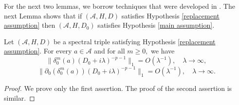     For the next two lemmas, we borrow { techniques} that were developed in \cite{CGRS2}. The next Lemma shows that if $(\mathcal{A},H,D)$ satisfies
    Hypothesis \ref{replacement assumption} then $(\mathcal{A},H,D_0)$ satisfies Hypothesis \ref{main assumption}.
    \begin{lem}\label{main replacement lemma} 
        Let $(\mathcal{A},H,D)$ be a spectral triple satisfying Hypothesis \ref{replacement assumption}. For every $a\in\mathcal{A}$ and for all $m\geq0,$ we have 
        $$\Big\|\delta_0^m(a)(D_0+i\lambda)^{-p-1}\Big\|_1=O(\lambda^{-1}),\quad\lambda\to\infty,$$
        $$\Big\|\partial_0(\delta_0^m(a))(D_0+i\lambda)^{-p-1}\Big\|_1=O(\lambda^{-1}),\quad\lambda\to\infty.$$
    \end{lem}
    \begin{proof} 
        We prove only the first assertion. The proof of the second assertion is similar.
        

\end{proof}
